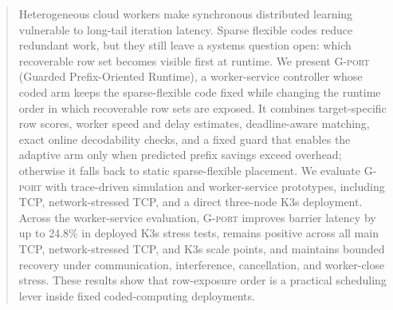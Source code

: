 \begin{abstract}
Heterogeneous cloud workers make synchronous distributed learning vulnerable to
long-tail iteration latency.  Sparse flexible codes reduce redundant work, but
they still leave a systems question open: which recoverable row set becomes
visible first at runtime.  We present \textsc{G-port} (Guarded Prefix-Oriented
Runtime), a worker-service controller whose coded arm keeps the
sparse-flexible code fixed while changing the runtime order in which
recoverable row sets are exposed.  It combines
target-specific row scores, worker speed and delay estimates, deadline-aware
matching, exact online decodability checks, and a fixed guard that enables the
adaptive arm only when predicted prefix savings exceed overhead; otherwise it
falls back to static sparse-flexible placement.  We evaluate \textsc{G-port}
with trace-driven simulation and worker-service
prototypes, including TCP, network-stressed TCP, and a direct three-node K3s
deployment.  Across the worker-service evaluation, \textsc{G-port} improves
barrier latency by up to 24.8\% in deployed K3s stress tests, remains positive
across all main TCP, network-stressed TCP, and K3s scale points, and maintains
bounded recovery under communication, interference, cancellation, and
worker-close stress.  These
results show that row-exposure order is a practical scheduling lever inside
fixed coded-computing deployments.
\end{abstract}
